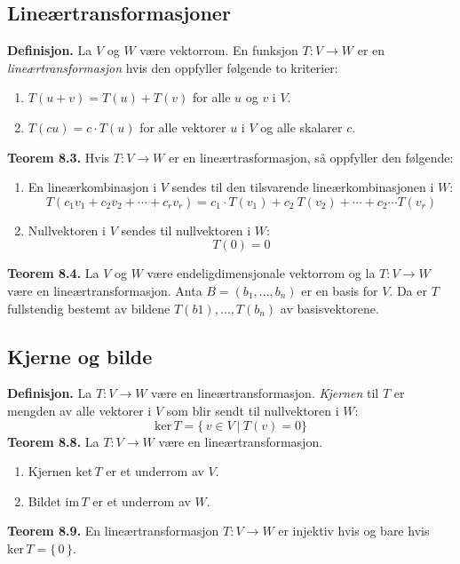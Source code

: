 \documentclass{article}
\begin{document}
\subsection{Lineærtransformasjoner}
\textbf{Definisjon.} La $V$ og $W$ være vektorrom. En funksjon $T: V \rightarrow W$ er en \textit{lineærtransformasjon} hvis den oppfyller følgende to kriterier:
\begin{enumerate}
    \item $T(u + v) = T(u) + T(v)$ for alle $u$ og $v$ i $V$.
    \item $T(cu) = c \cdot T(u)$ for alle vektorer $u$ i $V$ og alle skalarer $c$.
\end{enumerate}
\textbf{Teorem 8.3.} Hvis $T: V \rightarrow W$ er en lineærtrasformasjon, så oppfyller den følgende:
\begin{enumerate}
    \item En lineærkombinasjon i $V$ sendes til den tilsvarende lineærkombinasjonen i $W$:
    \[T(c_1v_1 + c_2v_2 + \cdots + c_rv_r) = c_1 \cdot T(v_1) + c_2 \ T(v_2) + \cdots + c_2 \cdots T(v_r) \]
    \item Nullvektoren i $V$ sendes til nullvektoren i $W$: \[ T(0) = 0 \]
\end{enumerate}
\textbf{Teorem 8.4.} La $V$ og $W$ være endeligdimensjonale vektorrom og la $T: V \rightarrow W$ være en lineærtransformasjon. Anta $B = (b_1, \dots, b_n)$ er en basis for $V$. Da er $T$ fullstendig bestemt av bildene $T(b1), \dots, T(b_n)$ av basisvektorene.


\subsection{Kjerne og bilde}
\textbf{Definisjon.} La $T: V \rightarrow W$ være en lineærtransformasjon. \textit{Kjernen} til $T$ er mengden av alle vektorer i $V$ som blir sendt til nullvektoren i $W$:
\[ \text{ker}\,T = \{\,v \in V \ | \ T(v) = 0 \} \]
\textbf{Teorem 8.8.} La $T: V \rightarrow W$ være en lineærtransformasjon.
\begin{enumerate}
    \item Kjernen $\text{ket}\,T$ er et underrom av $V$.
    \item Bildet $\text{im}\,T$ er et underrom av $W$.
\end{enumerate}
\textbf{Teorem 8.9.} En lineærtransformasjon $T: V \rightarrow W$ er injektiv hvis og bare hvis $\text{ker}\,T=\{\,0\,\}$.
\end{document}
